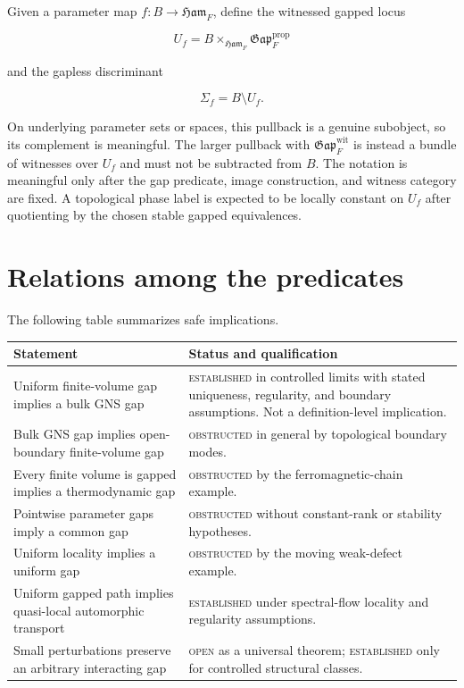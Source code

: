 \documentclass[12pt]{article}
\theoremstyle{definition}
\theoremstyle{remark}
\newcommand{\Ham}{\mathfrak{Ham}}
\newcommand{\Gap}{\mathfrak{Gap}}
\newcommand{\status}[1]{\textsc{#1}}
\begin{document}
Given a parameter map $f:B\to\Ham_F$, define the witnessed gapped locus

\[
U_f=B\times_{\Ham_F}\Gap_F^{\mathrm{prop}}
\]

and the gapless discriminant

\[
\Sigma_f=B\setminus U_f.
\]

On underlying parameter sets or spaces, this pullback is a genuine subobject,
so its complement is meaningful. The larger pullback with
$\Gap_F^{\mathrm{wit}}$ is instead a bundle of witnesses over $U_f$ and must
not be subtracted from $B$. The notation is meaningful only after the gap
predicate, image construction, and witness category are fixed. A topological
phase label is expected to be locally constant on $U_f$ after quotienting by
the chosen stable gapped equivalences.

\section{Relations among the predicates}

The following table summarizes safe implications.

\begin{center}
\begin{tabular}{p{}p{}}
\toprule
Statement & Status and qualification \\
\midrule
Uniform finite-volume gap implies a bulk GNS gap
& \status{established} in controlled limits with stated uniqueness,
regularity, and boundary assumptions. Not a definition-level implication.\\[3pt]
Bulk GNS gap implies open-boundary finite-volume gap
& \status{obstructed} in general by topological boundary modes.\\[3pt]
Every finite volume is gapped implies a thermodynamic gap
& \status{obstructed} by the ferromagnetic-chain example.\\[3pt]
Pointwise parameter gaps imply a common gap
& \status{obstructed} without constant-rank or stability hypotheses.\\[3pt]
Uniform locality implies a uniform gap
& \status{obstructed} by the moving weak-defect example.\\[3pt]
Uniform gapped path implies quasi-local automorphic transport
& \status{established} under spectral-flow locality and regularity assumptions.\\[3pt]
Small perturbations preserve an arbitrary interacting gap
& \status{open} as a universal theorem; \status{established} only for
controlled structural classes.\\
\bottomrule
\end{tabular}
\end{center}
\end{document}
